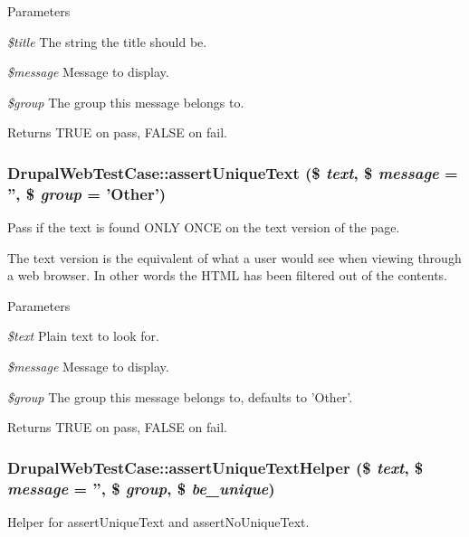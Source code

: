 \begin{DoxyParams}{Parameters}
\item[{\em \$title}]The string the title should be. \item[{\em \$message}]Message to display. \item[{\em \$group}]The group this message belongs to. \end{DoxyParams}
\begin{DoxyReturn}{Returns}
TRUE on pass, FALSE on fail. 
\end{DoxyReturn}
\hypertarget{classDrupalWebTestCase_aa8d65b2749e7d0430b07bd77f7f4877b}{
\subsubsection[{assertUniqueText}]{\setlength{\rightskip}{0pt plus 5cm}DrupalWebTestCase::assertUniqueText (\$ {\em text}, \/  \$ {\em message} = {\ttfamily ''}, \/  \$ {\em group} = {\ttfamily 'Other'})}}
\label{classDrupalWebTestCase_aa8d65b2749e7d0430b07bd77f7f4877b}
Pass if the text is found ONLY ONCE on the text version of the page.

The text version is the equivalent of what a user would see when viewing through a web browser. In other words the HTML has been filtered out of the contents.


\begin{DoxyParams}{Parameters}
\item[{\em \$text}]Plain text to look for. \item[{\em \$message}]Message to display. \item[{\em \$group}]The group this message belongs to, defaults to 'Other'. \end{DoxyParams}
\begin{DoxyReturn}{Returns}
TRUE on pass, FALSE on fail. 
\end{DoxyReturn}
\hypertarget{classDrupalWebTestCase_a26023bcb28eac7d4674eb430e7af6b2d}{
\subsubsection[{assertUniqueTextHelper}]{\setlength{\rightskip}{0pt plus 5cm}DrupalWebTestCase::assertUniqueTextHelper (\$ {\em text}, \/  \$ {\em message} = {\ttfamily ''}, \/  \$ {\em group}, \/  \$ {\em be\_\-unique})}}
\label{classDrupalWebTestCase_a26023bcb28eac7d4674eb430e7af6b2d}
Helper for assertUniqueText and assertNoUniqueText.

